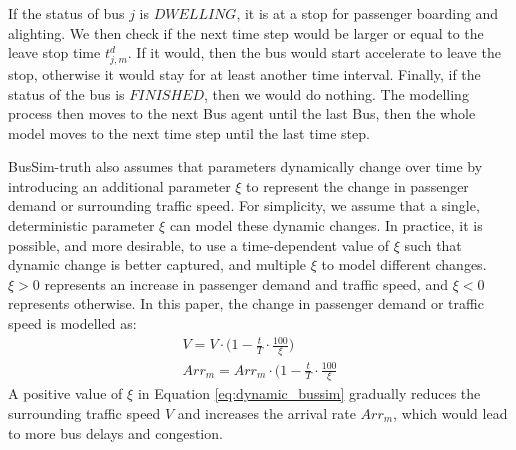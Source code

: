 If the status of bus $j$ is $DWELLING$, it is at a stop for passenger boarding and alighting. We then check if the next time step would be larger or equal to the leave stop time $t^d_{j,m}$. If it would, then the bus would start accelerate to leave the stop, otherwise it would stay for at least another time interval. Finally, if the status of the bus is $FINISHED$, then we would do nothing. The modelling process then moves to the next Bus agent until the last Bus, then the whole model moves to the next time step until the last time step. 

BusSim-truth also assumes that parameters dynamically change over time by introducing an additional parameter $\xi$ to represent the change in passenger demand or surrounding traffic speed. For simplicity, we assume that a single, deterministic parameter $\xi$ can model these dynamic changes. In practice, it is possible, and more desirable, to use a time-dependent value of $\xi$ such that dynamic change is better captured, and multiple $\xi$ to model different changes. $\xi>0$ represents an increase in passenger demand and traffic speed, and $\xi<0$ represents otherwise. In this paper, the change in passenger demand or traffic speed is modelled as: 
\begin{align}
V = V \cdot \big( 1 - \frac{t}{T} \cdot \frac{100}{\xi} \big) \\
Arr_m = Arr_m \cdot (1 - \frac{t}{T} \cdot \frac{100}{\xi}
\label{eq:dynamic_bussim}
\end{align}
A positive value of $\xi$ in Equation \ref{eq:dynamic_bussim} gradually reduces the surrounding traffic speed $V$ and increases the arrival rate $Arr_m$, which would lead to more bus delays and congestion. 
